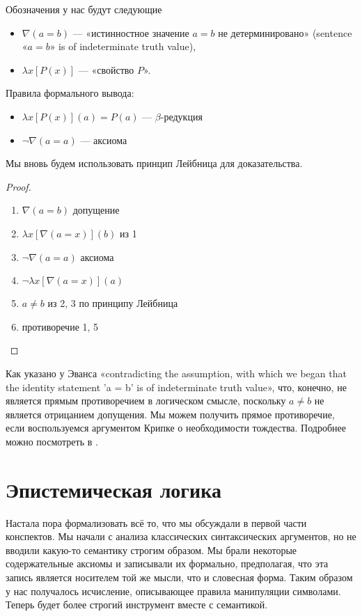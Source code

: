 \documentclass[openany]{book}
\theoremstyle{plain}
\theoremstyle{definition}
\begin{document}
Обозначения у нас будут следующие
\begin{itemize}
\item \(\nabla (a = b)\) — «истинностное значение \(a = b\) не детерминировано» (sentence «\(a = b\)» is of indeterminate truth value),
\item \(\lambda x [P(x)]\) — «свойство \(P\)».
\end{itemize}

Правила формального вывода:
\begin{itemize}
\item \(\lambda x [P(x)](a) = P(a)\) — \(\beta\)-редукция
\item \(\neg \nabla (a = a)\) — аксиома
\end{itemize}

Мы вновь будем использовать принцип Лейбница для доказательства.

\begin{proof}
\begin{enumerate}
\item \(\nabla (a = b)\) допущение
\item \(\lambda x [\nabla(a = x)](b)\) из 1
\item \(\neg \nabla(a = a)\) аксиома
\item \(\neg \lambda x [\nabla(a = x)](a)\)
\item \(a \not= b\) из 2, 3 по принципу Лейбница
\item противоречие 1, 5
\end{enumerate}
\end{proof}
 
 Как указано у Эванса «contradicting the assumption, with which we began that the identity statement 'a = b' is of indeterminate truth value», что, конечно, не является прямым противоречием в логическом смысле, поскольку \(a \not= b\) не является отрицанием допущения. Мы можем получить прямое противоречие, если воспользуемся аргументом Крипке о необходимости тождества. Подробнее можно посмотреть в \cite{Evans}.

\chapter{Эпистемическая логика}

Настала пора формализовать всё то, что мы обсуждали в первой части конспектов. Мы начали с анализа классических синтаксических аргументов, но не вводили какую-то семантику строгим образом. Мы брали некоторые содержательные аксиомы и записывали их формально, предполагая, что эта запись является носителем той же мысли, что и словесная форма. Таким образом у нас получалось исчисление, описывающее правила манипуляции символами. Теперь будет более строгий инструмент вместе с семантикой.
\end{document}
